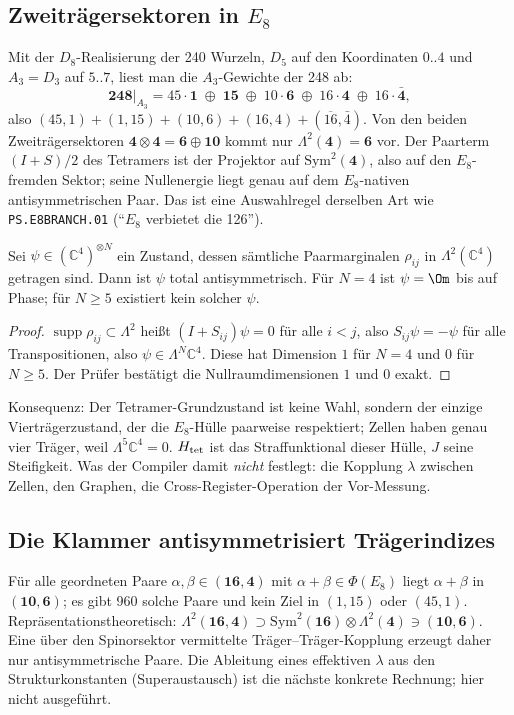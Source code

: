 \subsection{Zweiträgersektoren in $E_8$}
Mit der $D_8$-Realisierung der 240 Wurzeln, $D_5$ auf den Koordinaten $0..4$ und $A_3=D_3$ auf $5..7$, liest man die $A_3$-Gewichte der 248 ab:
\[
\mathbf{248}\big|_{A_3}=45\cdot\mathbf 1\;\oplus\;\mathbf{15}\;\oplus\;10\cdot\mathbf 6\;\oplus\;16\cdot\mathbf 4\;\oplus\;16\cdot\bar{\mathbf 4},
\]
also $(45,1)+(1,15)+(10,6)+(16,4)+(\overline{16},\bar 4)$. Von den beiden Zweiträgersektoren $\mathbf 4\otimes\mathbf 4=\mathbf 6\oplus\mathbf{10}$ kommt nur $\Lambda^2(\mathbf 4)=\mathbf 6$ vor. Der Paarterm $(I+S)/2$ des Tetramers ist der Projektor auf $\mathrm{Sym}^2(\mathbf 4)$, also auf den $E_8$-fremden Sektor; seine Nullenergie liegt genau auf dem $E_8$-nativen antisymmetrischen Paar. Das ist eine Auswahlregel derselben Art wie \texttt{PS.E8BRANCH.01} (\enquote{$E_8$ verbietet die 126}).

\begin{satz}
Sei $\psi\in(\mathbb C^4)^{\otimes N}$ ein Zustand, dessen sämtliche Paarmarginalen $\rho_{ij}$ in $\Lambda^2(\mathbb C^4)$ getragen sind. Dann ist $\psi$ total antisymmetrisch. Für $N=4$ ist $\psi=\Om$ bis auf Phase; für $N\ge5$ existiert kein solcher $\psi$.
\end{satz}
\begin{proof}
$\operatorname{supp}\rho_{ij}\subset\Lambda^2$ heißt $(I+S_{ij})\psi=0$ für alle $i<j$, also $S_{ij}\psi=-\psi$ für alle Transpositionen, also $\psi\in\Lambda^N\mathbb C^4$. Diese hat Dimension $1$ für $N=4$ und $0$ für $N\ge5$. Der Prüfer bestätigt die Nullraumdimensionen $1$ und $0$ exakt.
\end{proof}

Konsequenz: Der Tetramer-Grundzustand ist keine Wahl, sondern der einzige Vierträgerzustand, der die $E_8$-Hülle paarweise respektiert; Zellen haben genau vier Träger, weil $\Lambda^5\mathbb C^4=0$. $H_{\rm tet}$ ist das Straffunktional dieser Hülle, $J$ seine Steifigkeit. Was der Compiler damit \emph{nicht} festlegt: die Kopplung $\lambda$ zwischen Zellen, den Graphen, die Cross-Register-Operation der Vor-Messung.

\subsection{Die Klammer antisymmetrisiert Trägerindizes}
Für alle geordneten Paare $\alpha,\beta\in(\mathbf{16},\mathbf 4)$ mit $\alpha+\beta\in\Phi(E_8)$ liegt $\alpha+\beta$ in $(\mathbf{10},\mathbf 6)$; es gibt 960 solche Paare und kein Ziel in $(1,15)$ oder $(45,1)$. Repräsentationstheoretisch: $\Lambda^2(\mathbf{16},\mathbf 4)\supset\mathrm{Sym}^2(\mathbf{16})\otimes\Lambda^2(\mathbf 4)\ni(\mathbf{10},\mathbf 6)$. Eine über den Spinorsektor vermittelte Träger--Träger-Kopplung erzeugt daher nur antisymmetrische Paare. Die Ableitung eines effektiven $\lambda$ aus den Strukturkonstanten (Superaustausch) ist die nächste konkrete Rechnung; hier nicht ausgeführt.

